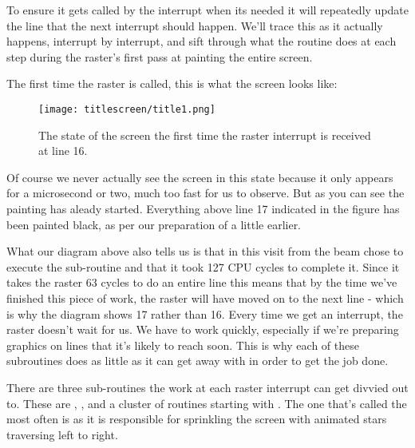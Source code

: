 To ensure it gets called by the interrupt when its needed it will repeatedly update the line that the next interrupt
should happen. We'll trace this as it actually happens, interrupt by interrupt, and sift through what the routine
does at each step during the raster's first pass at painting the entire screen.

The first time the raster is called, this is what the screen looks like:

\begin{figure}[H]
    \centering
      \texttt{[image: titlescreen/title1.png]}%
\caption{The state of the screen the first time the raster interrupt is received at line 16.}
\end{figure}

Of course we never actually see the screen in this state because it only appears for a microsecond or two, much too
fast for us to observe. But as you can see the painting has aleady started. Everything above line 17 indicated in 
the figure has been painted black, as per our preparation of  a little earlier.

What our diagram above also tells us is that in this visit from the beam  chose to execute
the sub-routine  and that it took 127 CPU cycles to complete it. Since it takes the
raster 63 cycles to do an entire line this means that by the time we've finished this piece of work, the raster will have
moved on to the next line - which is why the diagram shows 17 rather than 16. Every time we get an interrupt, the 
raster doesn't wait for us. We have to work quickly, especially if we're preparing graphics on lines that it's likely
to reach soon. This is why each of these subroutines does as little as it can get away with in order to get the job done.

There are three sub-routines the work at each raster interrupt can get divvied out to. These are ,
, and a cluster of routines starting with . The one
that's called the most often is  as it is responsible for sprinkling the screen with 
animated stars traversing left to right.

